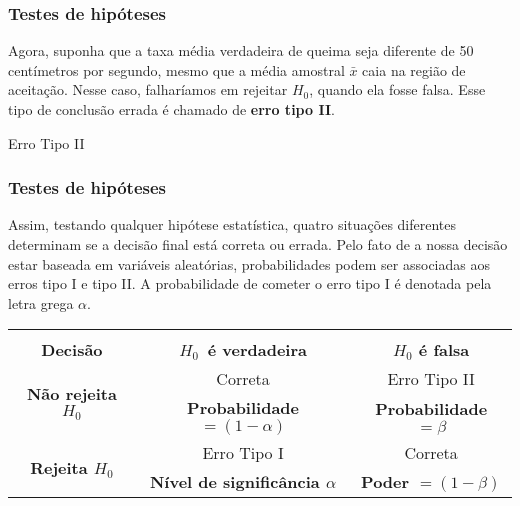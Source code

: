 \documentclass[14pt,aspectratio=1610]{beamer}
\begin{document}
\begin{frame}{}
\frametitle{Testes de hipóteses}
\begin{block}{}
\justifying
Agora, suponha que a taxa média verdadeira de queima seja diferente de 50 centímetros por segundo, mesmo que a média amostral $\bar{x}$ caia na região de 
aceitação. Nesse caso, falharíamos em rejeitar $H_{0}$, quando ela fosse falsa. Esse tipo de conclusão errada é chamado de \textbf{erro tipo II}.
\end{block}
\pause
\begin{block}{Erro Tipo II}
\end{block}
\end{frame}

\begin{frame}{}
\frametitle{Testes de hipóteses}
\begin{block}{}
\justifying
Assim, testando qualquer hipótese estatística, quatro situações diferentes determinam se a decisão final está correta ou errada. Pelo fato de a nossa decisão estar 
baseada em variáveis aleatórias, probabilidades podem ser associadas aos erros tipo I e tipo II. A probabilidade de cometer o erro tipo I é denotada pela letra grega 
$\alpha$.
 \end{block}

\begin{block}{}
\begin{center}
\begin{table}[]
\begin{tabular}{c|c|c}
&&\\
                          \textbf{Decisão}                   &\textbf{$H_{0}\,$ é verdadeira}                         &\textbf{$H_{0}$ é falsa}\\ \hline
 \multirow{2}{*}{\textbf{Não rejeita $H_{0}$}}&Correta                                                               &Erro Tipo II\\
                                                                        &\textbf{Probabilidade $=\left(1-\alpha \right)$} &\textbf{Probabilidade $=\beta$}\\ \hline
\multirow{2}{*}{\textbf{Rejeita $H_{0}$}}       &Erro Tipo I                                                          &  Correta\\
                                                                        &\textbf{Nível de significância $\alpha$}            &\textbf{Poder $=\left( 1-\beta\right)$}\\ \hline
\end{tabular}
\end{table}
\end{center}
\end{block}

\end{frame}
\end{document}

